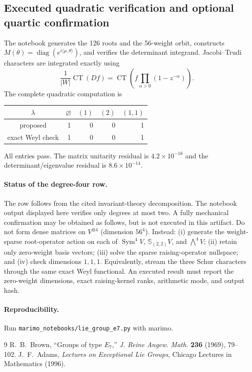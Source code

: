 \documentclass[10pt]{article}
\newcommand{\CT}{\operatorname{CT}}
\begin{document}
\subsection{Executed quadratic verification and optional quartic confirmation}
The notebook generates the 126 roots and the 56-weight orbit, constructs
$M(\theta)=\operatorname{diag}(e^{i\langle\mu,\theta\rangle})$, and verifies
the determinant integrand.  Jacobi--Trudi characters are integrated exactly
using
\[
 \frac1{|W|}\CT(Df)=\CT\left(f\prod_{\alpha>0}(1-z^{-\alpha})\right).
\]
The complete quadratic computation is
\begin{center}\small
\begin{tabular}{@{}c|rrrr@{}}\toprule
$\lambda$&$\varnothing$&$(1)$&$(2)$&$(1,1)$\\\midrule
proposed&1&0&0&1\\
exact Weyl check&1&0&0&1\\\bottomrule
\end{tabular}
\end{center}
All entries pass.  The matrix unitarity residual is $4.2\times10^{-16}$ and
the determinant/eigenvalue residual is $8.6\times10^{-14}$.

\paragraph{Status of the degree-four row.}
The row follows from the cited invariant-theory decomposition.  The notebook
output displayed here verifies only degrees at most two.  A fully mechanical
confirmation may be obtained as follows, but is not executed in this
artifact.  Do not form dense matrices on
$V^{\otimes4}$ (dimension $56^4$).  Instead: (i) generate the weight-sparse
root-operator action on each of $\operatorname{Sym}^4V$, $\mathbb S_{(2,2)}V$,
and $\bigwedge^4V$; (ii) retain only zero-weight basis vectors; (iii) solve the
sparse raising-operator nullspace; and (iv) check dimensions $1,1,1$.
Equivalently, stream the three Schur characters through the same exact Weyl
functional.  An executed result must report the zero-weight dimensions,
exact raising-kernel ranks, arithmetic mode, and output hash.

\paragraph{Reproducibility.} Run \texttt{marimo\_notebooks/lie\_group\_e7.py} with marimo.
\begin{thebibliography}{9}
 R.~B.~Brown, ``Groups of type $E_7$,'' \emph{J. Reine Angew.
Math.} \textbf{236} (1969), 79--102.
 J.~F.~Adams, \emph{Lectures on Exceptional Lie Groups},
Chicago Lectures in Mathematics (1996).
\end{thebibliography}
\endgroup
\end{document}
